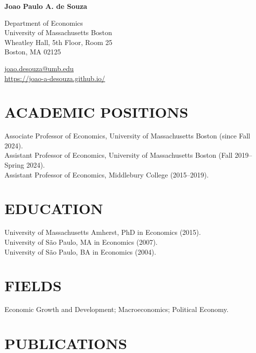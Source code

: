 \documentclass[10pt]{article}
\begin{document}
\begin{center}
{\LARGE\bfseries Joao Paulo A. de Souza}\\[7pt]
\begin{minipage}[t]{0.56\textwidth}
Department of Economics\\
University of Massachusetts Boston\\
Wheatley Hall, 5th Floor, Room 25\\
Boston, MA 02125
\end{minipage}
\hfill
\begin{minipage}[t]{0.39\textwidth}
\raggedleft
\href{mailto:joao.desouza@umb.edu}{joao.desouza@umb.edu}\\
\url{https://joao-a-desouza.github.io/}
\end{minipage}
\end{center}
\vspace{2pt}

\section{ACADEMIC POSITIONS}

Associate Professor of Economics, University of Massachusetts Boston
(since Fall 2024).\\
Assistant Professor of Economics, University of Massachusetts Boston
(Fall 2019--Spring 2024).\\
Assistant Professor of Economics, Middlebury College (2015--2019).

\section{EDUCATION}

University of Massachusetts Amherst, PhD in Economics (2015).\\
University of S\~ao Paulo, MA in Economics (2007).\\
University of S\~ao Paulo, BA in Economics (2004).

\section{FIELDS}

Economic Growth and Development; Macroeconomics; Political Economy.

\section{PUBLICATIONS}
\end{document}
